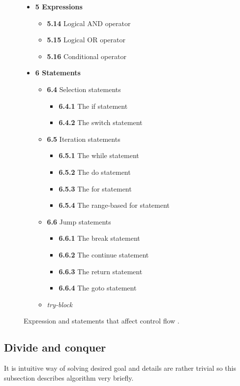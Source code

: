 \begin{figure}[t!]
\caption{Expression and statements that affect control flow \cite{ISO:C++}.}
\label{control-stmt-expr}
\begin{itemize}
\item{\textbf{5 Expressions}}
	\begin{itemize}
	\item{\textbf{5.14} Logical AND operator}
	\item{\textbf{5.15} Logical OR operator}
	\item{\textbf{5.16} Conditional operator}
	\end{itemize}
\item{\textbf{6 Statements}}
	\begin{itemize}
	\item{\textbf{6.4} Selection statements}
		\begin{itemize}
		\item{\textbf{6.4.1} The if statement}
		\item{\textbf{6.4.2} The switch statement}
		\end{itemize}
	\item{\textbf{6.5} Iteration statements}
		\begin{itemize}
		\item{\textbf{6.5.1} The while statement}
		\item{\textbf{6.5.2} The do statement}
		\item{\textbf{6.5.3} The for statement}
		\item{\textbf{6.5.4} The range-based for statement}
		\end{itemize}
	\item{\textbf{6.6} Jump statements}
		\begin{itemize}
		\item{\textbf{6.6.1} The break statement}
		\item{\textbf{6.6.2} The continue statement}
		\item{\textbf{6.6.3} The return statement}
		\item{\textbf{6.6.4} The goto statement}
		\end{itemize}
	\item{\textit{try-block}}
	\end{itemize}
\end{itemize}
\end{figure}

\subsection{Divide and conquer}
It is intuitive way of solving desired goal and details are rather trivial so this subsection describes algorithm very briefly.

